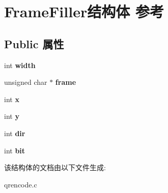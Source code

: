 \hypertarget{struct_frame_filler}{\section{Frame\-Filler结构体 参考}
\label{struct_frame_filler}
}
\subsection*{Public 属性}
\begin{DoxyCompactItemize}
\item 
\hypertarget{struct_frame_filler_ae40fbdfcfd12acd318c0983bae112a41}{int {\bfseries width}}\label{struct_frame_filler_ae40fbdfcfd12acd318c0983bae112a41}

\item 
\hypertarget{struct_frame_filler_af62dd5268e5d105eb0b8c5eee478d84a}{unsigned char $\ast$ {\bfseries frame}}\label{struct_frame_filler_af62dd5268e5d105eb0b8c5eee478d84a}

\item 
\hypertarget{struct_frame_filler_a1c88e4707a8f31367dc10917b423e88c}{int {\bfseries x}}\label{struct_frame_filler_a1c88e4707a8f31367dc10917b423e88c}

\item 
\hypertarget{struct_frame_filler_a40b9439e9c0cd149785944dd9c695481}{int {\bfseries y}}\label{struct_frame_filler_a40b9439e9c0cd149785944dd9c695481}

\item 
\hypertarget{struct_frame_filler_ad497b0999a8574bfbff501d68c893534}{int {\bfseries dir}}\label{struct_frame_filler_ad497b0999a8574bfbff501d68c893534}

\item 
\hypertarget{struct_frame_filler_abf2006539482b99bbf47cbba183bd0ff}{int {\bfseries bit}}\label{struct_frame_filler_abf2006539482b99bbf47cbba183bd0ff}

\end{DoxyCompactItemize}


该结构体的文档由以下文件生成\-:\begin{DoxyCompactItemize}
\item 
qrencode.\-c\end{DoxyCompactItemize}
